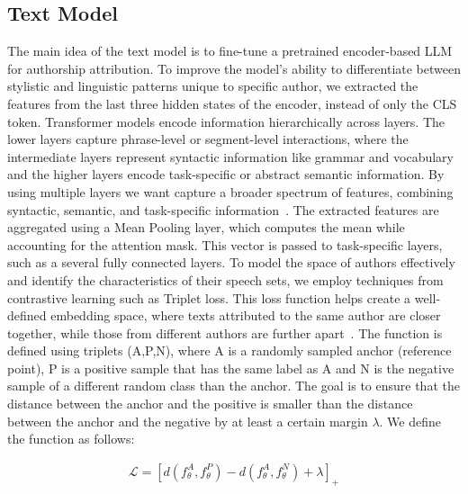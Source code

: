 \documentclass{Interspeech}
\begin{document}
\subsection{Text Model}

The main idea of the text model is to fine-tune a pretrained encoder-based LLM
for authorship attribution. To improve the model's ability to differentiate
between stylistic and linguistic patterns unique to specific author, we
extracted the features from the last three hidden states of the encoder,
instead of only the CLS token. Transformer models encode information
hierarchically across layers. The lower layers capture phrase-level or
segment-level interactions, where the intermediate layers represent syntactic
information like grammar and vocabulary and the higher layers encode
task-specific or abstract semantic information. By using multiple layers we
want capture a broader spectrum of features, combining syntactic, semantic, and
task-specific information~\cite{jawahar2019does}. The extracted features are
aggregated using a Mean Pooling layer, which computes the mean while accounting
for the attention mask. This vector is passed to task-specific layers, such as
a several fully connected layers. To model the space of authors effectively and
identify the characteristics of their speech sets, we employ techniques from
contrastive learning such as Triplet loss. This loss function helps create a
well-defined embedding space, where texts attributed to the same author are
closer together, while those from different authors are further
apart~\cite{mao2019metric}. The function is defined using triplets (A,P,N),
where A is a randomly sampled anchor (reference point), P is a positive sample
that has the same label as A and N is the negative sample of a different random
class than the anchor. The goal is to ensure that the distance between the
anchor and the positive is smaller than the distance between the anchor and the
negative by at least a certain margin $\lambda$. We define the function as
follows:


\begin{align}
  \mathcal{L} = [d(f_\theta^{A},f_\theta^{P}) - d(f_\theta^{A},f_\theta^{N}) + \lambda]_{+}
  \label{eq:triplet_loss}
\end{align}

\end{document}
